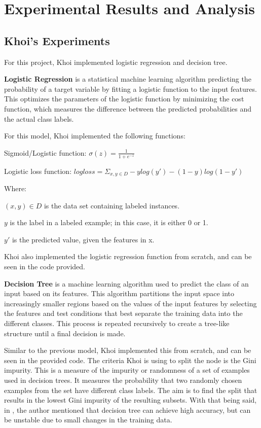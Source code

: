 \section{Experimental Results and Analysis}

\subsection{Khoi's Experiments}

For this project, Khoi implemented logistic regression and decision tree.

\textbf{Logistic Regression} is a statistical machine learning algorithm predicting the probability of a target variable by fitting a logistic function to the input features. This optimizes the parameters of the logistic function by minimizing the cost function, which measures the difference between the predicted probabilities and the actual class labels.

For this model, Khoi implemented the following functions:

Sigmoid/Logistic function: $\sigma(z) = \frac{1}{1 + e^{-z}}$

Logistic loss function: $log loss = \Sigma_{x, y \in D} -ylog(y') - (1 - y)log(1 - y')$

Where:

$(x, y) \in D$ is the data set containing labeled instances.

$y$ is the label in a labeled example; in this case, it is either 0 or 1.

$y'$ is the predicted value, given the features in x.

Khoi also implemented the logistic regression function from scratch, and can be seen in the code provided.

\textbf{Decision Tree} is a machine learning algorithm used to predict the class of an input based on its features. This algorithm partitions the input space into increasingly smaller regions based on the values of the input features by selecting the features and test conditions that best separate the training data into the different classes. This process is repeated recursively to create a tree-like structure until a final decision is made.

Similar to the previous model, Khoi implemented this from scratch, and can be seen in the provided code. The criteria Khoi is using to split the node is the Gini impurity. This is a measure of the impurity or randomness of a set of examples used in decision trees. It measures the probability that two randomly chosen examples from the set have different class labels. The aim is to find the split that results in the lowest Gini impurity of the resulting subsets. With that being said, in \cite{breiman1984classification}, the author mentioned that decision tree can achieve high accuracy, but can be unstable due to small changes in the training data.

